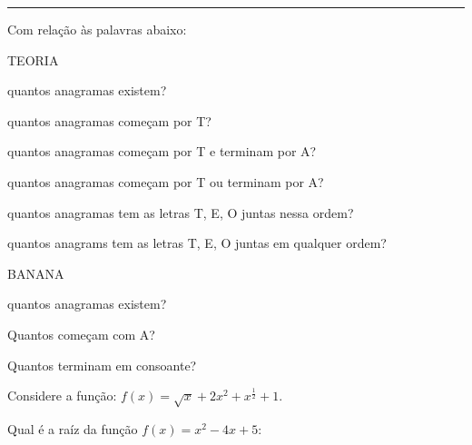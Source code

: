 \documentclass[12pt]{exam}
\newcommand{\parte}{\item}
\newcommand{\subparte}{\item}
\renewcommand*\half{.5}
\begin{document}
\noindent
\rule[1ex]{\textwidth}{1pt}
\begin{questions}
\question[\half] \citep{ Hazzan(1993)}
Com relação às palavras abaixo:
\begin{partes}
\parte TEORIA
\begin{subpartes}
\subparte quantos anagramas existem? 
\subparte quantos anagramas começam por T? 
\subparte quantos anagramas começam por T e terminam por A? 
\subparte quantos anagramas começam por T ou terminam por A? 
\subparte quantos anagramas tem as letras T, E, O juntas nessa ordem? 
\subparte quantos anagrams tem as letras T, E, O juntas em qualquer ordem?
\end{subpartes}
\parte
BANANA
\begin{subpartes}
\subparte quantos anagramas existem? 
\subparte Quantos começam com A? 
\subparte Quantos terminam em consoante?  
\end{subpartes}
\end{partes}
\question[\half] Considere a função: $f(x)=\sqrt{x}+2x^2+x^{\frac{1}{2}}+1$.
\addpoints
\question[\half]Qual é a raíz da função $f(x)=x^2-4x+5$: 
\begin{parts}
\setlength{\columnsep}{30pt}
\end{parts}
\end{questions}
\end{document}
